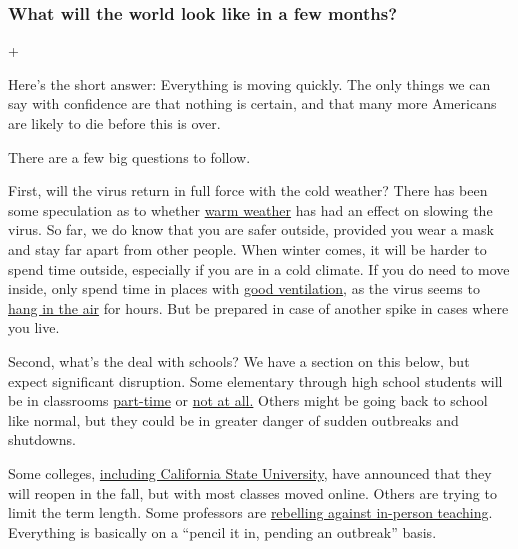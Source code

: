 \hypertarget{what-will-the-world-look-like-in-a-few-months}{%
\subsubsection{What will the world look like in a few
months?}\label{what-will-the-world-look-like-in-a-few-months}}

+

Here's the short answer: Everything is moving quickly. The only things
we can say with confidence are that nothing is certain, and that many
more Americans are likely to die before this is over.

There are a few big questions to follow.

First, will the virus return in full force with the cold weather? There
has been some speculation as to whether
\href{https://www.nytimes3xbfgragh.onion/2020/03/22/health/warm-weather-coronavirus.html}{warm
weather} has had an effect on slowing the virus. So far, we do know that
you are safer outside, provided you wear a mask and stay far apart from
other people. When winter comes, it will be harder to spend time
outside, especially if you are in a cold climate. If you do need to move
inside, only spend time in places with
\href{https://www.nytimes3xbfgragh.onion/2020/07/06/health/coronavirus-airborne-aerosols.html}{good
ventilation}, as the virus seems to
\href{https://www.nytimes3xbfgragh.onion/2020/07/04/health/239-experts-with-one-big-claim-the-coronavirus-is-airborne.html}{hang
in the air} for hours. But be prepared in case of another spike in cases
where you live.

Second, what's the deal with schools? We have a section on this below,
but expect significant disruption. Some elementary through high school
students will be in classrooms
\href{https://www.nytimes3xbfgragh.onion/2020/06/26/us/coronavirus-schools-reopen-fall.html}{part-time}
or
\href{https://www.nytimes3xbfgragh.onion/2020/07/13/us/lausd-san-diego-school-reopening.html}{not
at all.} Others might be going back to school like normal, but they
could be in greater danger of sudden outbreaks and shutdowns.

Some colleges,
\href{https://www.nytimes3xbfgragh.onion/2020/05/12/us/cal-state-online-classes.html}{including
California State University}, have announced that they will reopen in
the fall, but with most classes moved online. Others are trying to limit
the term length. Some professors are
\href{https://www.nytimes3xbfgragh.onion/2020/07/03/us/coronavirus-college-professors.html}{rebelling
against in-person teaching}. Everything is basically on a ``pencil it
in, pending an outbreak'' basis.

